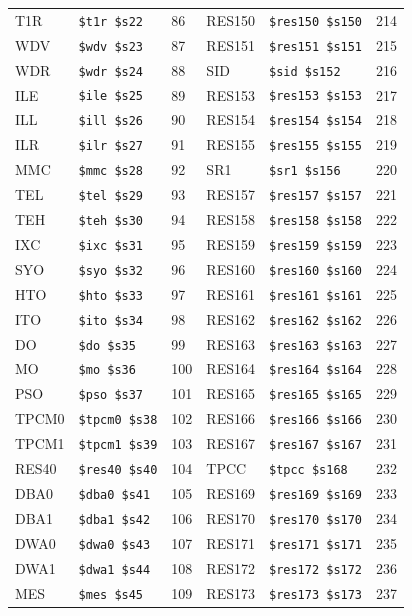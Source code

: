 \begin{table}
\begin{center}
{\begin{tabular}{|l|l|l||l|l|l|}
T1R & \verb|$t1r $s22| & 86 &
RES150 & \verb|$res150 $s150| & 214 \\
WDV & \verb|$wdv $s23| & 87 &
RES151 & \verb|$res151 $s151| & 215 \\
WDR & \verb|$wdr $s24| & 88 &
SID & \verb|$sid $s152| & 216 \\
ILE & \verb|$ile $s25| & 89 &
RES153 & \verb|$res153 $s153| & 217 \\
ILL & \verb|$ill $s26| & 90 &
RES154 & \verb|$res154 $s154| & 218 \\
ILR & \verb|$ilr $s27| & 91 &
RES155 & \verb|$res155 $s155| & 219 \\
MMC & \verb|$mmc $s28| & 92 &
SR1 & \verb|$sr1 $s156| & 220 \\
TEL & \verb|$tel $s29| & 93 &
RES157 & \verb|$res157 $s157| & 221 \\
TEH & \verb|$teh $s30| & 94 &
RES158 & \verb|$res158 $s158| & 222 \\
IXC & \verb|$ixc $s31| & 95 &
RES159 & \verb|$res159 $s159| & 223 \\
SYO & \verb|$syo $s32| & 96 &
RES160 & \verb|$res160 $s160| & 224 \\
HTO & \verb|$hto $s33| & 97 &
RES161 & \verb|$res161 $s161| & 225 \\
ITO & \verb|$ito $s34| & 98 &
RES162 & \verb|$res162 $s162| & 226 \\
DO & \verb|$do $s35| & 99 &
RES163 & \verb|$res163 $s163| & 227 \\
MO & \verb|$mo $s36| & 100 &
RES164 & \verb|$res164 $s164| & 228 \\
PSO & \verb|$pso $s37| & 101 &
RES165 & \verb|$res165 $s165| & 229 \\
TPCM0 & \verb|$tpcm0 $s38| & 102 &
RES166 & \verb|$res166 $s166| & 230 \\
TPCM1 & \verb|$tpcm1 $s39| & 103 &
RES167 & \verb|$res167 $s167| & 231 \\
RES40 & \verb|$res40 $s40| & 104 &
TPCC & \verb|$tpcc $s168| & 232 \\
DBA0 & \verb|$dba0 $s41| & 105 &
RES169 & \verb|$res169 $s169| & 233 \\
DBA1 & \verb|$dba1 $s42| & 106 &
RES170 & \verb|$res170 $s170| & 234 \\
DWA0 & \verb|$dwa0 $s43| & 107 &
RES171 & \verb|$res171 $s171| & 235 \\
DWA1 & \verb|$dwa1 $s44| & 108 &
RES172 & \verb|$res172 $s172| & 236 \\
MES & \verb|$mes $s45| & 109 &
RES173 & \verb|$res173 $s173| & 237 \\

\end{tabular}}
\end{center}
\end{table}
